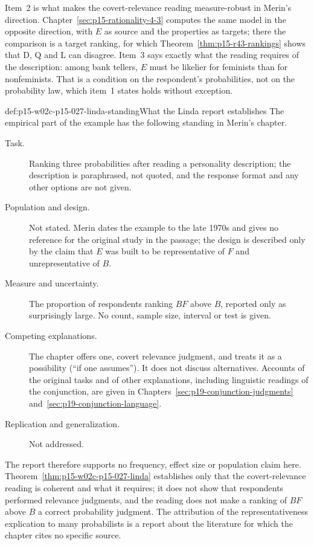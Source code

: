 Item~2 is what makes the covert-relevance reading measure-robust in
Merin's direction. Chapter~\ref{sec:p15-rationality-4-3} computes the
same model in the opposite direction, with \(E\) as source and the
properties as targets; there the comparison is a target ranking, for
which Theorem~\ref{thm:p15-r43-rankings} shows that D, Q and L can
disagree. Item~3 says exactly what the reading requires of the
description: among bank tellers, \(E\) must be likelier for feminists
than for nonfeminists. That is a condition on the respondent's
probabilities, not on the probability law, which item~1 states holds
without exception.

\begin{hbwarning}{def:p15-w02c-p15-027-linda-standing}{What the Linda report establishes}
The empirical part of the example has the following standing in
Merin's chapter.
\begin{description}
\item[Task.] Ranking three probabilities after reading a personality
  description; the description is paraphrased, not quoted, and the
  response format and any other options are not given.
\item[Population and design.] Not stated. Merin dates the example to the
  late 1970s and gives no reference for the original study in the
  passage; the design is described only by the claim that \(E\) was
  built to be representative of \(F\) and unrepresentative of \(B\).
\item[Measure and uncertainty.] The proportion of respondents ranking
  \(BF\) above \(B\), reported only as surprisingly large. No count,
  sample size, interval or test is given.
\item[Competing explanations.] The chapter offers one, covert relevance
  judgment, and treats it as a possibility (``if one assumes''). It
  does not discuss alternatives. Accounts of the original tasks and of
  other explanations, including linguistic readings of the conjunction,
  are given in Chapters~\ref{sec:p19-conjunction-judgments}
  and~\ref{sec:p19-conjunction-language}.
\item[Replication and generalization.] Not addressed.
\end{description}
The report therefore supports no frequency, effect size or population
claim here. Theorem~\ref{thm:p15-w02c-p15-027-linda} establishes only
that the covert-relevance reading is coherent and what it requires; it
does not show that respondents performed relevance judgments, and the
reading does not make a ranking of \(BF\) above \(B\) a correct
probability judgment. The attribution of the representativeness
explication to many probabilists is a report about the literature for
which the chapter cites no specific source.
\end{hbwarning}

